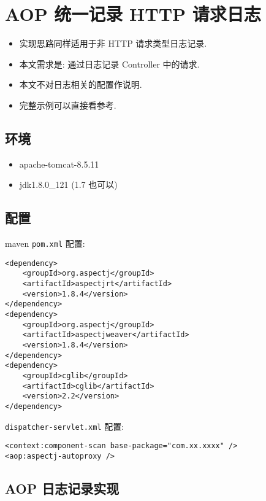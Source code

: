 \section{AOP 统一记录 HTTP
请求日志}\label{aop-ux7edfux4e00ux8bb0ux5f55-http-ux8bf7ux6c42ux65e5ux5fd7}

\begin{itemize}
\tightlist
\item
  实现思路同样适用于非 HTTP 请求类型日志记录.
\item
  本文需求是: 通过日志记录 Controller 中的请求.
\item
  本文不对日志相关的配置作说明.
\item
  完整示例可以直接看参考.
\end{itemize}

\subsection{环境}\label{ux73afux5883}

\begin{itemize}
\tightlist
\item
  apache-tomcat-8.5.11
\item
  jdk1.8.0\_121 (1.7 也可以)
\end{itemize}

\subsection{配置}\label{ux914dux7f6e}

maven \texttt{pom.xml} 配置:

\begin{verbatim}
<dependency>
    <groupId>org.aspectj</groupId>
    <artifactId>aspectjrt</artifactId>
    <version>1.8.4</version>
</dependency>
<dependency>
    <groupId>org.aspectj</groupId>
    <artifactId>aspectjweaver</artifactId>
    <version>1.8.4</version>
</dependency>
<dependency>
    <groupId>cglib</groupId>
    <artifactId>cglib</artifactId>
    <version>2.2</version>
</dependency>
\end{verbatim}

\texttt{dispatcher-servlet.xml} 配置:

\begin{verbatim}
<context:component-scan base-package="com.xx.xxxx" />
<aop:aspectj-autoproxy />
\end{verbatim}

\subsection{AOP
日志记录实现}\label{aop-ux65e5ux5fd7ux8bb0ux5f55ux5b9eux73b0}

